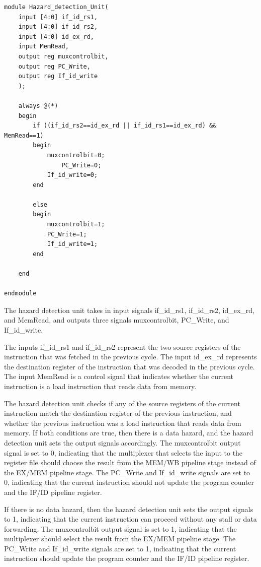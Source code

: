 \documentclass{article}
\begin{document}
\begin{lstlisting}[caption={Hazard Detection Unit}, captionpos=b, language=RISC-V]
module Hazard_detection_Unit(
    input [4:0] if_id_rs1,
    input [4:0] if_id_rs2,
    input [4:0] id_ex_rd,
    input MemRead,
    output reg muxcontrolbit,
    output reg PC_Write,
    output reg If_id_write
    );
    
    always @(*)    
    begin 
        if ((if_id_rs2==id_ex_rd || if_id_rs1==id_ex_rd) &&  MemRead==1)
        begin
            muxcontrolbit=0;
                PC_Write=0;         
            If_id_write=0;
        end
        
        else 
        begin
            muxcontrolbit=1;
            PC_Write=1;
            If_id_write=1;
        end 
        
    end 
    
endmodule
\end{lstlisting}

The hazard detection unit takes in input signals if\_id\_rs1, if\_id\_rs2, id\_ex\_rd, and MemRead, and outputs three signals muxcontrolbit, PC\_Write, and If\_id\_write.

The inputs if\_id\_rs1 and if\_id\_rs2 represent the two source registers of the instruction that was fetched in the previous cycle. The input id\_ex\_rd represents the destination register of the instruction that was decoded in the previous cycle. The input MemRead is a control signal that indicates whether the current instruction is a load instruction that reads data from memory.

The hazard detection unit checks if any of the source registers of the current instruction match the destination register of the previous instruction, and whether the previous instruction was a load instruction that reads data from memory. If both conditions are true, then there is a data hazard, and the hazard detection unit sets the output signals accordingly. The muxcontrolbit output signal is set to 0, indicating that the multiplexer that selects the input to the register file should choose the result from the MEM/WB pipeline stage instead of the EX/MEM pipeline stage. The PC\_Write and If\_id\_write signals are set to 0, indicating that the current instruction should not update the program counter and the IF/ID pipeline register.

If there is no data hazard, then the hazard detection unit sets the output signals to 1, indicating that the current instruction can proceed without any stall or data forwarding. The muxcontrolbit output signal is set to 1, indicating that the multiplexer should select the result from the EX/MEM pipeline stage. The PC\_Write and If\_id\_write signals are set to 1, indicating that the current instruction should update the program counter and the IF/ID pipeline register.
\end{document}
